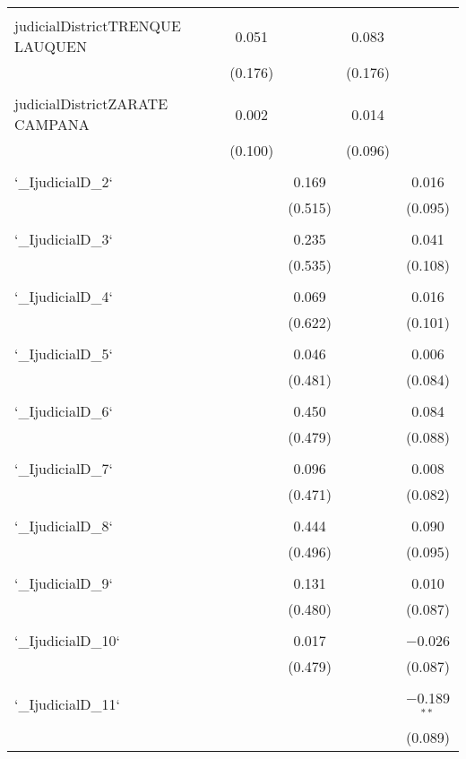 \begin{table}[!htbp]
\begin{tabular}{@{\extracolsep{5pt}}lccccc}
  & & & & & \\ 
 judicialDistrictTRENQUE LAUQUEN &  & 0.051 &  & 0.083 &  \\ 
  &  & (0.176) &  & (0.176) &  \\ 
  & & & & & \\ 
 judicialDistrictZARATE CAMPANA &  & 0.002 &  & 0.014 &  \\ 
  &  & (0.100) &  & (0.096) &  \\ 
  & & & & & \\ 
 `\_IjudicialD\_2` &  &  & 0.169 &  & 0.016 \\ 
  &  &  & (0.515) &  & (0.095) \\ 
  & & & & & \\ 
 `\_IjudicialD\_3` &  &  & 0.235 &  & 0.041 \\ 
  &  &  & (0.535) &  & (0.108) \\ 
  & & & & & \\ 
 `\_IjudicialD\_4` &  &  & 0.069 &  & 0.016 \\ 
  &  &  & (0.622) &  & (0.101) \\ 
  & & & & & \\ 
 `\_IjudicialD\_5` &  &  & 0.046 &  & 0.006 \\ 
  &  &  & (0.481) &  & (0.084) \\ 
  & & & & & \\ 
 `\_IjudicialD\_6` &  &  & 0.450 &  & 0.084 \\ 
  &  &  & (0.479) &  & (0.088) \\ 
  & & & & & \\ 
 `\_IjudicialD\_7` &  &  & 0.096 &  & 0.008 \\ 
  &  &  & (0.471) &  & (0.082) \\ 
  & & & & & \\ 
 `\_IjudicialD\_8` &  &  & 0.444 &  & 0.090 \\ 
  &  &  & (0.496) &  & (0.095) \\ 
  & & & & & \\ 
 `\_IjudicialD\_9` &  &  & 0.131 &  & 0.010 \\ 
  &  &  & (0.480) &  & (0.087) \\ 
  & & & & & \\ 
 `\_IjudicialD\_10` &  &  & 0.017 &  & $-$0.026 \\ 
  &  &  & (0.479) &  & (0.087) \\ 
  & & & & & \\ 
 `\_IjudicialD\_11` &  &  &  &  & $-$0.189$^{**}$ \\ 
  &  &  &  &  & (0.089) \\ 

\end{tabular}
\end{table}
